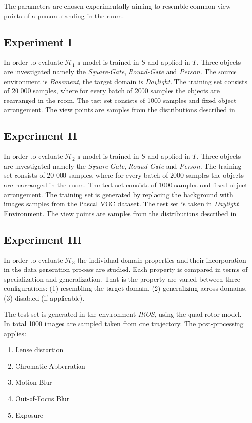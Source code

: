 The parameters are chosen experimentally aiming to resemble common view points of a person standing in the room.

\subsection{Experiment I}

In order to evaluate $\mathcal{H}_1$ a model is trained in $S$ and applied in $T$. Three objects are investigated namely the \textit{Square-Gate}, \textit{Round-Gate} and \textit{Person.} The source environment is \textit{Basement}, the target domain is \textit{Daylight.} The training set consists of 20 000 samples, where for every batch of 2000 samples the objects are rearranged in the room. The test set consists of 1000 samples and fixed object arrangement. The view points are samples from the distributions described in 

\subsection{Experiment II}

In order to evaluate $\mathcal{H}_2$ a model is trained in $S$ and applied in $T$. Three objects are investigated namely the \textit{Square-Gate}, \textit{Round-Gate} and \textit{Person.}  The training set consists of 20 000 samples, where for every batch of 2000 samples the objects are rearranged in the room. The test set consists of 1000 samples and fixed object arrangement. The training set is generated by replacing the background with images samples from the Pascal VOC dataset. The test set is taken in \textit{Daylight} Environment. The view points are samples from the distributions described in 

\subsection{Experiment III}

In order to evaluate $\mathcal{H}_3$ the individual domain properties and their incorporation in the data generation process are studied. Each property is compared in terms of specialization and generalization. That is the property are varied between three configurations: (1) resembling the target domain, (2) generalizing across domains, (3) disabled (if applicable).

The test set is generated in the environment \textit{IROS}, using the quad-rotor model. In total 1000 images are sampled taken from one trajectory. The post-processing applies:
\begin{enumerate}
	\item Lense distortion
	\item Chromatic Abberration
	\item Motion Blur
	\item Out-of-Focus Blur
	\item Exposure
\end{enumerate}


